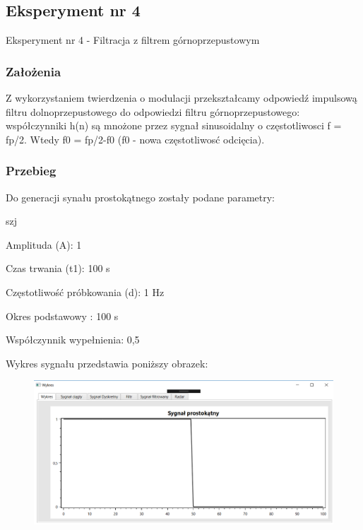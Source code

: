 \documentclass[12pt]{article}
\begin{document}

\subsection{Eksperyment nr 4}

Eksperyment nr 4  - Filtracja z filtrem górnoprzepustowym
\subsubsection{Założenia}
Z wykorzystaniem twierdzenia o modulacji przekształcamy odpowiedź impulsową filtru dolnoprzepustowego do odpowiedzi filtru górnoprzepustowego:
współczynniki h(n) są mnożone przez sygnał sinusoidalny  o częstotliwosci f = fp/2. Wtedy f0 = fp/2-f0 (f0 -  nowa częstotliwosć odcięcia).

\subsubsection{Przebieg}
Do generacji synału prostokątnego zostały podane parametry:

\begin{labeling}{szj}
\item [Amplituda (A):] 1
\item [Czas trwania (t1):] 100 s
\item [Częstotliwość próbkowania (d): ] 1 Hz
\item [Okres podstawowy :] 100 s
\item [Współczynnik wypełnienia:] 0,5
\end{labeling}

Wykres sygnału przedstawia poniższy obrazek:
\begin{figure}[h!]
 \centering
 \includegraphics[width=12.3cm]{prost.PNG}
 \vspace{-0.3cm}
 \label{gw}
\end{figure}
\end{document}
